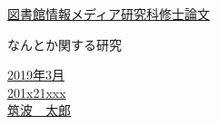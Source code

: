 \thispagestyle{empty}
\begin{center}
\fontsize{20pt}{40pt}\selectfont
\underline{図書館情報メディア研究科修士論文}

\vspace{3cm} %
なんとか関する研究
\vspace{3cm} %

\underline{2019年3月}\\
\vspace{-0.3cm} %
\underline{201x21xxx}\\
\vspace{-0.3cm} %
\underline{筑波　太郎}

\end{center}
